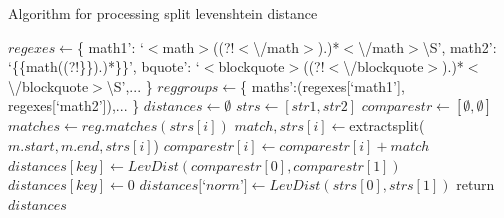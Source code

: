 \documentclass[t]{beamer}
\newcommand{\tab}[1]{\hspace{.08\textwidth}{#1}} %
\begin{document}
\begin{frame}{Algorithm for processing split levenshtein distance}
  \tiny
  \begin{algorithmic}
    \State $regexes \gets $\{
    \Statex \tab`math1': `$<$math$>$((?!$<${\textbackslash}/math$>$).)*$<${\textbackslash}/math$>${\textbackslash}S',
    \Statex \tab`math2': `\{\{math((?!\}\}).)*\}\}',
    \Statex \tab`bquote': `$<$blockquote$>$((?!$<${\textbackslash}/blockquote$>$).)*$<${\textbackslash}/blockquote$>${\textbackslash}S',...
    \Statex\}
    \State $reggroups \gets $\{\label{dist-calc-groups}
    \Statex  \tab`maths':(regexes[`math1'], regexes[`math2']),...
    \Statex \}
    \State $distances \gets \emptyset$
    \State $strs \gets [str1, str2]$
    \State $comparestr \gets [\emptyset , \emptyset]$
    \State $matches \gets reg.matches(strs[i])$
    \State $match, strs[i] \gets $extractsplit($m.start, m.end, strs[i]$)
    \State $comparestr[i] \gets comparestr[i] + match$
    \EndFor
    \EndFor
    \State $distances[key] \gets LevDist(comparestr[0], comparestr[1])$ \label{mprocess-spawn}
    \Else
    \State $distances[key] \gets 0$
    \EndIf
    \EndFor
    \State $distances[$`$norm$'$] \gets LevDist(strs[0], strs[1])$
    \State return $distances$\label{mprocess-return}
    \EndFunction
  \end{algorithmic}
\end{frame}
\end{document}
